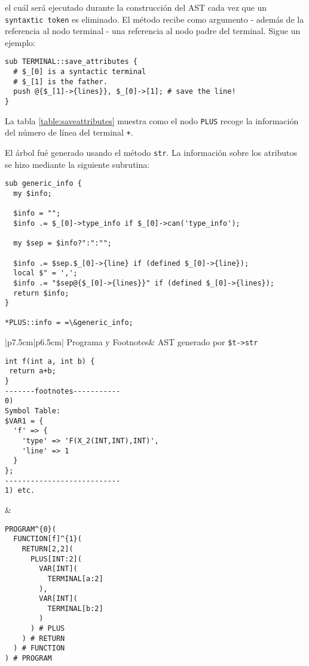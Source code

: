 \begin{center}
\end{center}

el cuál será ejecutado durante la construcción del AST cada vez
que un \verb|syntaxtic token| es eliminado. El método
recibe como argumento - además de la  referencia al nodo terminal -
una referencia al nodo padre del terminal. Sigue un ejemplo:

\begin{verbatim}
sub TERMINAL::save_attributes {
  # $_[0] is a syntactic terminal
  # $_[1] is the father.
  push @{$_[1]->{lines}}, $_[0]->[1]; # save the line!
}
\end{verbatim}

La tabla \ref{table:saveattributes} muestra como el nodo {\tt PLUS} 
recoge la información del número de línea del terminal {\tt+}.

El árbol fué generado usando el método \verb|str|. La información 
sobre los atributos se hizo mediante la siguiente subrutina:

\begin{verbatim}
sub generic_info {
  my $info;

  $info = "";
  $info .= $_[0]->type_info if $_[0]->can('type_info');

  my $sep = $info?":":"";

  $info .= $sep.$_[0]->{line} if (defined $_[0]->{line});
  local $" = ',';
  $info .= "$sep@{$_[0]->{lines}}" if (defined $_[0]->{lines});
  return $info;
}

*PLUS::info = =\&generic_info;
\end{verbatim}


\begin{table}[hbt]
\caption{El nodo {\tt PLUS} recoge el número de línea del terminal{\tt+}}
\label{table:saveattributes}
\begin{center}
\begin{tabular}{|p{7.5cm}|p{6.5cm}|}
\hline
Programa y Footnotes& AST generado por \verb|$t->str|\\
\hline
\begin{verbatim}
int f(int a, int b) {
 return a+b;
}
-------footnotes-----------
0)
Symbol Table:
$VAR1 = {
  'f' => {
    'type' => 'F(X_2(INT,INT),INT)',
    'line' => 1
  }
};
---------------------------
1) etc.
\end{verbatim}
&
\begin{verbatim}
PROGRAM^{0}(
  FUNCTION[f]^{1}(
    RETURN[2,2](
      PLUS[INT:2](
        VAR[INT](
          TERMINAL[a:2]
        ),
        VAR[INT](
          TERMINAL[b:2]
        )
      ) # PLUS
    ) # RETURN
  ) # FUNCTION
) # PROGRAM
\end{verbatim}\\
\hline
\end{tabular}
\end{center}
\end{table}

